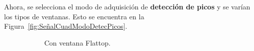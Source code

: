     Ahora, se selecciona el modo de adquisición de \textbf{detección de picos} y se varían los tipos de ventanas.
    Esto se encuentra en la Figura~\ref{fig:SeñalCuadModoDetecPicos}.
    \begin{figure}[H]
      \centering
      \begin{subfigure}[H]{0.40\textwidth}
        \caption{Con ventana Flattop.}
      \end{subfigure}
      \hfill 
      \begin{subfigure}[H]{0.40\textwidth}

\end{subfigure}
\end{figure}
